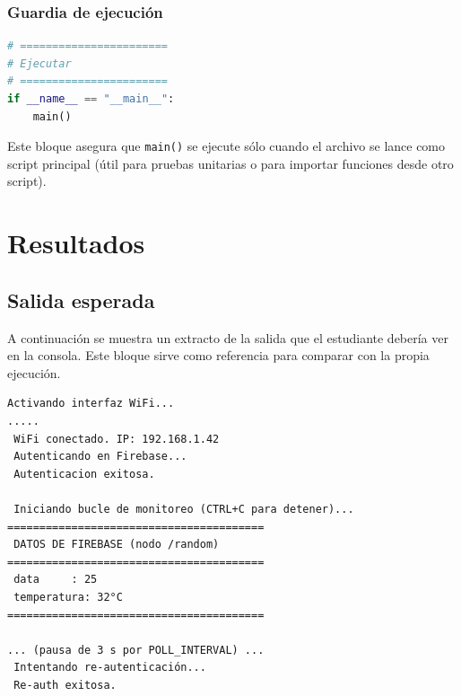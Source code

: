 \documentclass[a4paper,12pt]{article}
\begin{document}
\subsubsection{Guardia de ejecución}

\begin{lstlisting}[language=Python,caption={Ejecución condicional}]
# =======================
# Ejecutar
# =======================
if __name__ == "__main__":
    main()
\end{lstlisting}

Este bloque asegura que \texttt{main()} se ejecute sólo cuando el archivo se lance como script principal (útil para pruebas unitarias o para importar funciones desde otro script).


\section{Resultados}



\subsection{Salida esperada }
A continuación se muestra un extracto de la salida que el estudiante debería ver en la consola. Este bloque sirve como referencia para comparar con la propia ejecución.

\begin{lstlisting}[basicstyle=\ttfamily\small,caption={Salida de ejemplo en la consola (Thonny)}]
 Activando interfaz WiFi...
..... 
 WiFi conectado. IP: 192.168.1.42
 Autenticando en Firebase...
 Autenticacion exitosa.

 Iniciando bucle de monitoreo (CTRL+C para detener)...
========================================
 DATOS DE FIREBASE (nodo /random)
========================================
 data     : 25
 temperatura: 32°C
========================================

... (pausa de 3 s por POLL_INTERVAL) ...
 Intentando re-autenticación...
 Re-auth exitosa.
\end{lstlisting}
\end{document}
